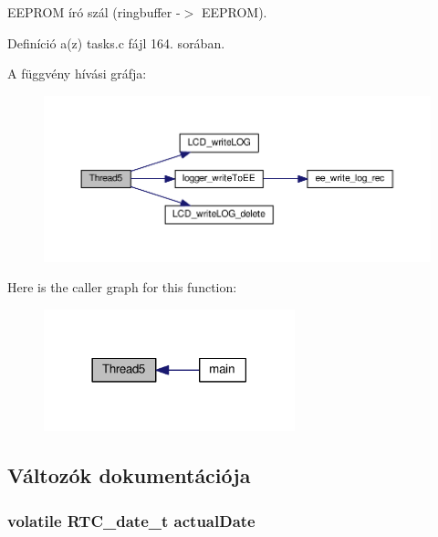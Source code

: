 E\-E\-P\-R\-O\-M író szál (ringbuffer -\/$>$ E\-E\-P\-R\-O\-M). 



Definíció a(z) tasks.\-c fájl 164. sorában.



A függvény hívási gráfja\-:
\nopagebreak
\begin{figure}[H]
\begin{center}
\leavevmode
\includegraphics[width=350pt]{tasks_8c_aad01c280ed05ea63627f5518167c5003_cgraph}
\end{center}
\end{figure}




Here is the caller graph for this function\-:
\nopagebreak
\begin{figure}[H]
\begin{center}
\leavevmode
\includegraphics[width=206pt]{tasks_8c_aad01c280ed05ea63627f5518167c5003_icgraph}
\end{center}
\end{figure}




\subsection{Változók dokumentációja}
\subsubsection[{actual\-Date}]{\setlength{\rightskip}{0pt plus 5cm}volatile R\-T\-C\-\_\-date\-\_\-t actual\-Date}\label{tasks_8c_a1fcf2a74e06883fb690c0c062bf9408c}



